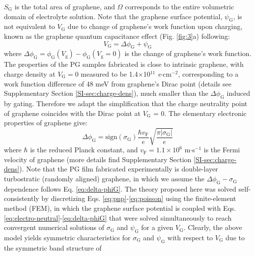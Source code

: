 \documentclass[journal=nalefd,email=true, hyperref=true, keywords=false]{achemso}
\newcommand{\Fig}{Fig.}
\begin{document}
$S_{\mathrm{G}}$ is the total area of graphene, and $\Omega$
corresponds to the entire volumetric domain of electrolyte
solution. Note that the graphene surface potential,
$\psi_{\mathrm{G}}$, is not equivalent to $V_{\mathrm{G}}$ due to
change of graphene's work function upon charging, known as the
graphene quantum capacitance effect\cite{Xia_2009} (\Fig{}
\ref{fig:3}a) following:
\begin{equation}
  \label{eq:Vg}
  V_{\mathrm{G}} = \Delta \phi_{\mathrm{G}} + \psi_{\mathrm{G}}
\end{equation}
where
$\Delta \phi_{\mathrm{G}} = \phi_{\mathrm{G}}(V_{\mathrm{g}}) -
\phi_{\mathrm{G}}(V_{\mathrm{g}}=0)$ is the change of graphene’s work
function. The properties of the PG samples fabricated is close to
intrinsic graphene, with charge density at $V_{\mathrm{G}}=0$ measured
to be 1.4$\times$10$^{11}$ \textit{e}$\cdot$cm$^{-2}$, corresponding
to a work function difference of 48 meV from graphene's Dirac point
(details see Supplementary Section \ref{SI-sec:charge-dens}), much
smaller than the $\Delta \phi_{\mathrm{G}}$ induced by gating.
Therefore we adapt the simplification that the charge neutrality point
of graphene coincides with the Dirac point at $V_{\mathrm{G}}$ =
0. The elementary electronic properties of graphene give:
\begin{equation}
  \label{eq:delta-phiG}
  \Delta \phi_{\mathrm{G}} = \mathrm{sign}(\sigma_{\mathrm{G}}) \frac{\hbar v_{\mathrm{F}}}{e}
  \sqrt{\frac{\pi |\sigma_{\mathrm{G}}|}{e}}
\end{equation}
where $\hbar$ is the reduced Planck constant, and
$v_{\mathrm{F}}=1.1\times10^{6}$ m$\cdot$s$^{-1}$ is the Fermi
velocity of graphene (more details find Supplementary Section
\ref{SI-sec:charge-dens}).  Note that the PG film fabricated
experimentally is double-layer turbostratic (randomly aligned)
graphene, in which we assume the
$\Delta \phi_{\mathrm{G}} - \sigma_{\mathrm{G}}$ dependence follows
Eq. \eqref{eq:delta-phiG}. The theory proposed here was solved
self-consistently by discretizing
Eqs. \eqref{eq:pnp}-\eqref{eq:poisson} using the finite-element method
(FEM), in which the graphene surface potential is coupled with
Eqs. \eqref{eq:electro-neutral}-\eqref{eq:delta-phiG} that were solved
simultaneously to reach convergent numerical solutions of
$\sigma_{\mathrm{G}}$ and $\psi_{\mathrm{G}}$ for a given
$V_{\mathrm{G}}$. Clearly, the above model yields symmetric
characteristics for $\sigma_{\mathrm{G}}$ and $\psi_{\mathrm{G}}$ with
respect to $V_{\mathrm{G}}$ due to the symmetric band structure of
\end{document}
